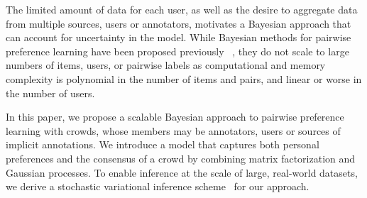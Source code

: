 The limited amount of data for each user,
as well as the desire to aggregate data from multiple sources, users or annotators,
motivates a Bayesian approach that can account for uncertainty in the model.
While Bayesian methods for pairwise preference learning have been proposed previously
~\citep{chu2009preference,houlsby2012collaborative,khan2014scalable}, 
they do not scale to large numbers of items, users, or
pairwise labels as computational and memory complexity is polynomial in the number
of items and pairs, and linear or worse in the number of users.

In this paper, we propose a scalable Bayesian approach to pairwise preference learning with crowds,
whose members may be annotators, users or sources of implicit annotations.
We introduce a model that %
captures both personal preferences and the consensus of a crowd by combining 
matrix factorization and Gaussian processes. %
To enable inference at the scale of large, real-world datasets,
we derive a stochastic variational inference scheme~\citep{hoffman2013stochastic} for our approach.
